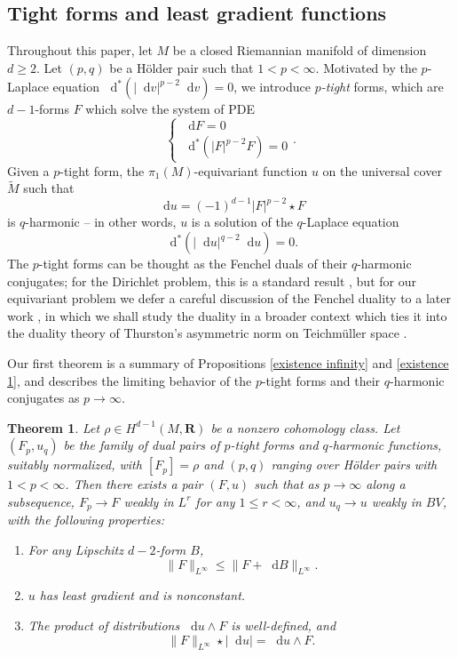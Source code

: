 \documentclass[reqno,11pt]{amsart}
\newcommand{\RR}{\mathbf{R}}
\newcommand*\dif{\mathop{}\!\mathrm{d}}
\newcommand{\dfn}[1]{\emph{#1}\index{#1}}
\newtheorem{mainthm}{Theorem}
\theoremstyle{definition}
\numberwithin{equation}{section}
\begin{document}
\subsection{Tight forms and least gradient functions}
Throughout this paper, let $M$ be a closed Riemannian manifold of dimension $d \geq 2$.
Let $(p, q)$ be a H\"older pair such that $1 < p < \infty$.
Motivated by the $p$-Laplace equation $\dif^*(|\dif v|^{p - 2} \dif v) = 0$, we introduce \dfn{$p$-tight} forms, which are $d-1$-forms $F$ which solve the system of PDE
$$\begin{cases}\dif F = 0 \\ \dif^*(|F|^{p - 2} F) = 0\end{cases}.$$
Given a $p$-tight form, the $\pi_1(M)$-equivariant function $u$ on the universal cover $\tilde M$ such that
\begin{equation}\label{harmonic conjugate}
\dif u = (-1)^{d - 1} |F|^{p - 2} \star F
\end{equation}
is $q$-harmonic -- in other words, $u$ is a solution of the $q$-Laplace equation 
$$\dif^*(|\dif u|^{q - 2} \dif u) = 0.$$
The $p$-tight forms can be thought as the Fenchel duals of their $q$-harmonic conjugates; for the Dirichlet problem, this is a standard result \cite[Chapter IV]{Ekeland99}, but for our equivariant problem we defer a careful discussion of the Fenchel duality to a later work \cite{BackusBest2}, in which we shall study the duality in a broader context which ties it into the duality theory of Thurston's asymmetric norm on Teichm\"uller space \cite{Thurston98}.

Our first theorem is a summary of Propositions \ref{existence infinity} and \ref{existence 1}, and describes the limiting behavior of the $p$-tight forms and their $q$-harmonic conjugates as $p \to \infty$.

\begin{mainthm}\label{existence of infinity tight forms}
Let $\rho \in H^{d - 1}(M, \RR)$ be a nonzero cohomology class.
Let $(F_p, u_q)$ be the family of dual pairs of $p$-tight forms and $q$-harmonic functions, suitably normalized, with $[F_p] = \rho$ and $(p, q)$ ranging over H\"older pairs with $1 < p < \infty$.
Then there exists a pair $(F, u)$ such that as $p \to \infty$ along a subsequence, $F_p \to F$ weakly in $L^r$ for any $1 \leq r < \infty$, and $u_q \to u$ weakly in $BV$, with the following properties:
\begin{enumerate}
\item For any Lipschitz $d - 2$-form $B$, 
\begin{equation}\label{best comass}
\|F\|_{L^\infty} \leq \|F + \dif B\|_{L^\infty}.
\end{equation}
\item $u$ has least gradient and is nonconstant.
\item The product of distributions $\dif u \wedge F$ is well-defined, and
\begin{equation}\label{max flow min cut}
\|F\|_{L^\infty} \star |\dif u| = \dif u \wedge F.
\end{equation}
\end{enumerate}
\end{mainthm}
\end{document}
